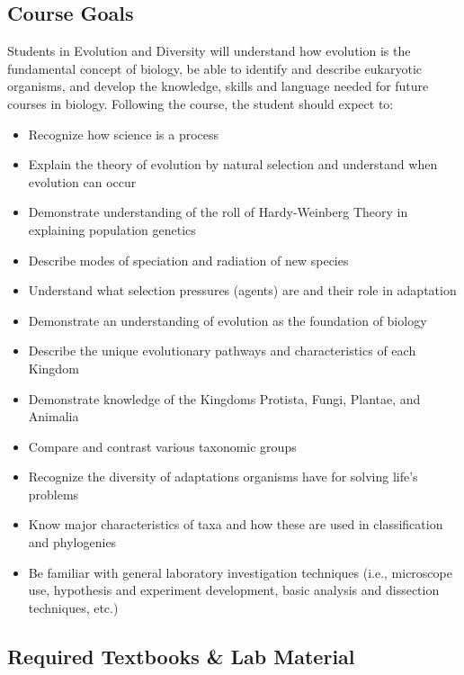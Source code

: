 \documentclass{tufte-handout}
\begin{document}
\begin{fullwidth}

\subsection{Course Goals}

Students in Evolution and Diversity will understand how evolution is the fundamental concept of biology, be able to identify and describe eukaryotic organisms, and develop the knowledge, skills and language needed for future courses in biology. Following the course, the student should expect to:

\begin{itemize}
	\item Recognize how science is a process
	\item Explain the theory of evolution by natural selection and understand when evolution can occur
	\item Demonstrate understanding of the roll of Hardy-Weinberg Theory in explaining population genetics
	\item Describe modes of speciation and radiation of new species
	\item Understand what selection pressures (agents) are and their role in adaptation
	\item Demonstrate an understanding of evolution as the foundation of biology
	\item Describe the unique evolutionary pathways and characteristics of each Kingdom
	\item Demonstrate knowledge of the Kingdoms Protista, Fungi, Plantae, and Animalia
	\item Compare and contrast various taxonomic groups
	\item Recognize the diversity of adaptations organisms have for solving life's problems
	\item Know major characteristics of taxa and how these are used in classification and phylogenies
	\item Be familiar with general laboratory investigation techniques (i.e., microscope use, hypothesis and experiment development, basic analysis and dissection techniques, etc.)
\end{itemize}

\subsection{Required Textbooks \& Lab Material}


\end{fullwidth}
\end{document}
